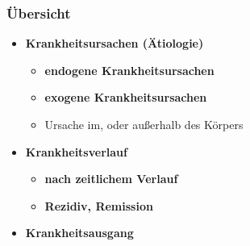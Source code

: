 \subsubsection{Übersicht}
	\begin{itemize}
		\item \textbf{Krankheitsursachen (Ätiologie)}
			\begin{itemize}
				\item \textbf{endogene Krankheitsursachen}
				\item \textbf{exogene Krankheitsursachen}
				\item Ursache im, oder außerhalb des Körpers
			\end{itemize}
		\item \textbf{Krankheitsverlauf}
			\begin{itemize}
				\item \textbf{nach zeitlichem Verlauf}
				\item \textbf{Rezidiv, Remission}
			\end{itemize}
		\item \textbf{Krankheitsausgang}
	\end{itemize}

